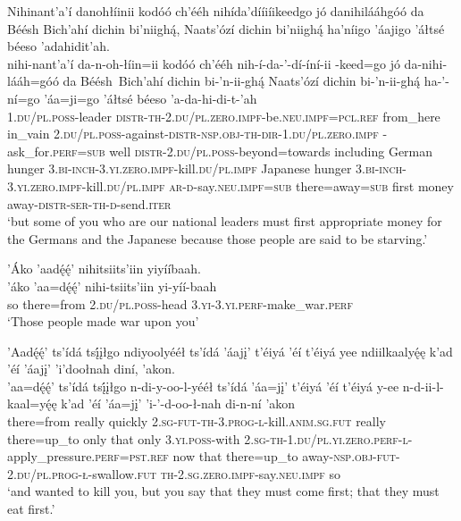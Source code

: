 \ea\label{ex:text7-17-10}
Nihinant’a’í danohłíinii kodóó ch’ééh nihída’dííiíikeedgo jó danihilááhgóó da Béésh Bich’ahí dichin bi’niighą́, Naats’ózí dichin bi’niighą́ ha’níigo ’áajigo ’áłtsé béeso ’adahidit’ah.\\
\gll nihi-nant’a’í	da-n-oh-łíin=ii	kodóó	ch’ééh nih-í-da-’-dí-íní-ii -keed=go	jó	da-nihi-lááh=góó	da	Béésh~{Bich’ahí}	dichin	bi-’n-ii-ghą́	Naats’ózí	dichin	bi-’n-ii-ghą́	ha-’-ní=go	’áa=ji=go	’áłtsé	béeso	’a-da-hi-di-t-’ah\\
     1.\textsc{du}/\textsc{pl}.\textsc{poss}-leader	\textsc{distr}-\textsc{th}-2.\textsc{du}/\textsc{pl}.\textsc{zero}.\textsc{impf}-be.\textsc{neu}.\textsc{impf}=\textsc{pcl}.\textsc{ref}	from\_here	in\_vain	2.\textsc{du}/\textsc{pl}.\textsc{poss}-against-\textsc{distr}-\textsc{nsp}.\textsc{obj}-\textsc{th}-\textsc{dir}-1.\textsc{du}/\textsc{pl}.\textsc{zero}.\textsc{impf} -ask\_for.\textsc{perf}=\textsc{sub}	well	\textsc{distr}-2.\textsc{du}/\textsc{pl}.\textsc{poss}-beyond=towards	including	German	hunger	3.\textsc{bi}-\textsc{inch}-3.\textsc{yi}.\textsc{zero}.\textsc{impf}-kill.\textsc{du}/\textsc{pl}.\textsc{impf}	Japanese	hunger	3.\textsc{bi}-\textsc{inch}-3.\textsc{yi}.\textsc{zero}.\textsc{impf}-kill.\textsc{du}/\textsc{pl}.\textsc{impf}	\textsc{ar}-\textsc{d}-say.\textsc{neu}.\textsc{impf}=\textsc{sub}	there=away=\textsc{sub}	first	money	away-\textsc{distr}-\textsc{ser}-\textsc{th}-\textsc{d}-send.\textsc{iter}\\
     \glt `but some of you who are our national leaders must first appropriate money for the Germans and the Japanese because those people are said to be starving.'
\z

\ea\label{ex:text7-17-11}
’Áko ’aadę́ę́’ nihitsiits’iin yiyííbaah.\\
\gll ’áko	’aa=dę́ę́’	nihi-tsiits’iin	yi-yíí-baah\\
     so	there=from	2.\textsc{du}/\textsc{pl}.\textsc{poss}-head	3.\textsc{yi}-3.\textsc{yi}.\textsc{perf}-make\_war.\textsc{perf}\\
\glt `Those people made war upon you'
\z

\ea\label{ex:text7-17-12}
’Aadę́ę́’ ts’ídá tsį́įłgo ndiyoolyééł ts’ídá ’áajį’ t’éiyá ’éí t’éiyá yee ndiilkaalyę́ę k’ad ’éí ’áajį’ ’i’doołnah diní, ’akon.\\
\gll ’aa=dę́ę́’	ts’ídá	tsį́įłgo	n-di-y-oo-l-yééł	ts’ídá	’áa=jį’	t’éiyá	’éí	t’éiyá	y-ee	n-d-ii-l-kaal=yę́ę	k’ad	’éí	’áa=jį’	’i-’-d-oo-ł-nah	di-n-ní	’akon\\
     there=from	really	quickly	2.\textsc{sg}-\textsc{fut}-\textsc{th}-3.\textsc{prog}-\textsc{l}-kill.\textsc{anim}.\textsc{sg}.\textsc{fut}	really	there=up\_to	only	that	only	3.\textsc{yi}.\textsc{poss}-with	2.\textsc{sg}-\textsc{th}-1.\textsc{du}/\textsc{pl}.\textsc{yi}.\textsc{zero}.\textsc{perf}-\textsc{l}-apply\_pressure.\textsc{perf}=\textsc{pst}.\textsc{ref}	now	that	there=up\_to	away-\textsc{nsp}.\textsc{obj}-\textsc{fut}-2.\textsc{du}/\textsc{pl}.\textsc{prog}-\textsc{ł}-swallow.\textsc{fut}	\textsc{th}-2.\textsc{sg}.\textsc{zero}.\textsc{impf}-say.\textsc{neu}.\textsc{impf}	so\\
\glt `and wanted to kill you, but you say that they must come first; that they must eat first.'
\z

